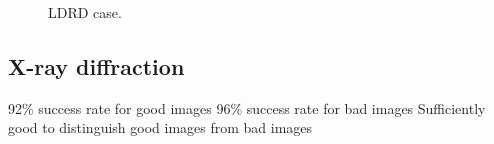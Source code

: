 \begin{figure}[!t]
\centering
{}
\hfil
{}
\caption{LDRD case.}
\label{fig:ldrd}
\end{figure}


\subsection{X-ray diffraction}\label{subsec:diffraction} %
92\% success rate for good images
96\% success rate for bad images
Sufficiently good to distinguish good images from bad images

